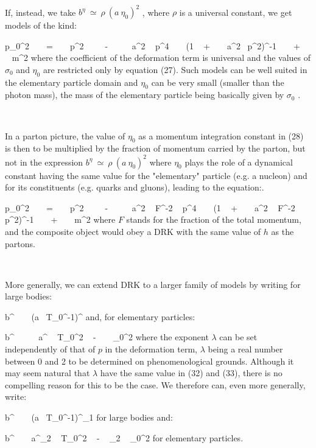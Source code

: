 \documentclass[a4paper,12pt,dvips]{article}
\begin{document}
~ 

If, instead, we take $b^{\eta } ~ \simeq ~ \rho ~ (a ~ \eta _0)^2$ , where $\rho $ is a universal constant, we get models of the kind:

\equation
p_{0}^2 ~ ~ = ~ ~ p^2 ~ ~ ~- ~ ~ \rho ~ a^2 ~ p^4 ~ ~ (1 ~ + ~ \rho ~ a^2~ p^2)^{-1} ~ ~ + ~ ~ m^2
\endequation
\noindent
where the coefficient of the deformation term is universal and the values of $\sigma _0$ and $\eta _0$ are restricted only by equation (27). Such models can be well suited in the elementary particle domain and $\eta _0$ can be very small (smaller than the photon mass), the mass of the elementary particle being basically given by $\sigma _0$ .

~ 

In a parton picture, the value of $\eta _0$ as a momentum integration constant in (28) is then to be multiplied by the fraction of momentum carried by the parton, but not in the expression $b^{\eta } ~ \simeq ~ \rho ~ (a ~ \eta _0)^2$ where $\eta _0$ plays the role of a dynamical constant having the same value for the "elementary" particle (e.g. a nucleon) and for its constituents (e.g. quarks and gluons), leading to the equation:.

\equation
p_{0}^2 ~ ~ = ~ ~ p^2 ~ ~ ~- ~ ~ \rho ~ a^2 ~ F^{-2} ~ p^4 ~ ~ (1 ~ + ~ \rho ~ a^2 ~ F^{-2} ~ p^2)^{-1} ~ ~ + ~ ~ m^2
\endequation
\noindent
where $F$ stands for the fraction of the total momentum, and the composite object would obey a DRK with the same value of $h$ as the partons.

~ 

More generally, we can extend DRK to a larger family of models by writing for large bodies:

\equation
b^{\eta } ~ \simeq ~ (a ~T_0^{-1})^{\lambda }
\endequation
\noindent
and, for elementary particles:

\equation
b^{\eta } ~ \simeq ~ \rho ~ a^{\lambda } ~ T_0^{2 ~ - ~ \lambda } ~ \eta _0^2
\endequation
\noindent
where the exponent $\lambda $ can be set independently of that of $p$ in the deformation term, $\lambda $ being a real number between 0 and 2 to be determined on phenomenological grounds. Although it may seem natural that $\lambda $ have the same value in (32) and (33), there is no compelling reason for this to be the case. We therefore can, even more generally, write:

\equation
b^{\eta } ~ \simeq ~ (a ~T_0^{-1})^{\lambda_1 }
\endequation
\noindent
for large bodies and:

\equation
b^{\eta } ~ \simeq ~ a^{\lambda_2 } ~ T_0^{2 ~ - ~ \lambda_2 } ~ \eta _0^2
\endequation
\noindent
for elementary particles.
\end{document}
